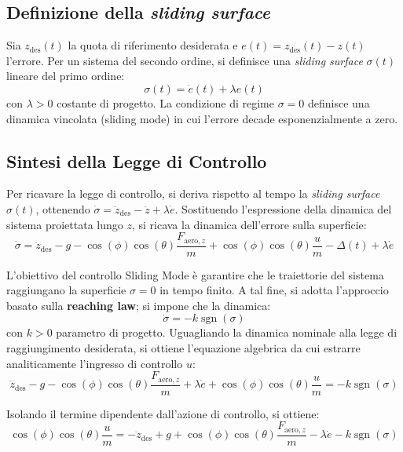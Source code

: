 \subsection{Definizione della \textit{sliding surface}}
Sia $z_{\mathrm{des}}(t)$ la quota di riferimento desiderata e $e(t) = z_{\mathrm{des}}(t) - z(t)$ l'errore. Per un sistema del secondo ordine, si definisce una \textit{sliding surface} $\sigma(t)$ lineare del primo ordine:
\begin{equation}
    \sigma(t) = \dot{e}(t) + \lambda e(t)
\end{equation}
con $\lambda > 0$ costante di progetto. La condizione di regime $\sigma = 0$ definisce una dinamica vincolata (sliding mode) in cui l'errore decade esponenzialmente a zero. 

\subsection{Sintesi della Legge di Controllo}
Per ricavare la legge di controllo, si deriva rispetto al tempo la \textit{sliding surface} $\sigma(t)$, ottenendo $\dot{\sigma} = \ddot{z}_{\mathrm{des}} - \ddot{z} + \lambda \dot{e}$. Sostituendo l'espressione della dinamica del sistema proiettata lungo $z$, si ricava la dinamica dell'errore sulla superficie:
\begin{equation}
    \dot{\sigma} = \ddot{z}_{\mathrm{des}} - g - \cos(\phi)\cos(\theta)\frac{F_{\mathrm{aero},z}}{m} + \cos(\phi)\cos(\theta)\frac{u}{m} - \Delta(t) + \lambda \dot{e}
\end{equation}

L'obiettivo del controllo Sliding Mode è garantire che le traiettorie del sistema raggiungano la superficie $\sigma = 0$ in tempo finito. 
A tal fine, si adotta l'approccio basato sulla \textbf{reaching law}; si impone che la dinamica:
\begin{equation}
    \dot{\sigma} = -k \operatorname{sgn}(\sigma)
\end{equation}
con $k > 0$ parametro di progetto. Uguagliando la dinamica nominale alla legge di raggiungimento desiderata, si ottiene l'equazione algebrica da cui estrarre analiticamente l'ingresso di controllo $u$:
\begin{equation}
    \ddot{z}_{\mathrm{des}} - g - \cos(\phi)\cos(\theta)\frac{F_{\mathrm{aero},z}}{m} + \lambda \dot{e} + \cos(\phi)\cos(\theta)\frac{u}{m} = -k \operatorname{sgn}(\sigma)
\end{equation}

Isolando il termine dipendente dall'azione di controllo, si ottiene:
\begin{equation}
    \cos(\phi)\cos(\theta)\frac{u}{m} = -\ddot{z}_{\mathrm{des}} + g + \cos(\phi)\cos(\theta)\frac{F_{\mathrm{aero},z}}{m} - \lambda \dot{e} - k \operatorname{sgn}(\sigma)
\end{equation}

